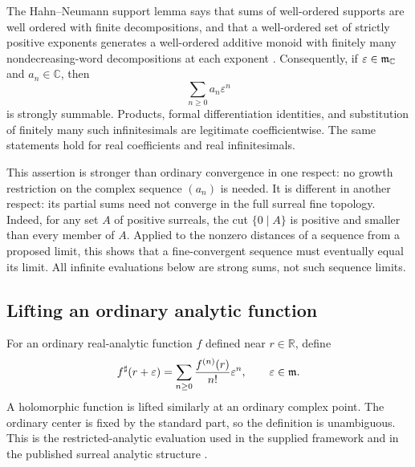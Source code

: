 \documentclass[11pt,letterpaper]{article}
\theoremstyle{definition}
\theoremstyle{remark}
\newcommand{\R}{\mathbb R}\newcommand{\C}{\mathbb C}
\newcommand{\sh}{^{\sharp}}
\numberwithin{equation}{section}
\begin{document}
The Hahn--Neumann support lemma says that sums of well-ordered supports are well ordered with finite decompositions, and that a well-ordered set of strictly positive exponents generates a well-ordered additive monoid with finitely many nondecreasing-word decompositions at each exponent \cite{Neumann,Poonen}. Consequently, if $\varepsilon\in\mm_\C$ and $a_n\in\C$, then
\[
 \sum_{n\ge0}a_n\varepsilon^n
\]
is strongly summable. Products, formal differentiation identities, and substitution of finitely many such infinitesimals are legitimate coefficientwise. The same statements hold for real coefficients and real infinitesimals.

This assertion is stronger than ordinary convergence in one respect: no growth restriction on the complex sequence $(a_n)$ is needed. It is different in another respect: its partial sums need not converge in the full surreal fine topology. Indeed, for any set $A$ of positive surreals, the cut $\{0\mid A\}$ is positive and smaller than every member of $A$. Applied to the nonzero distances of a sequence from a proposed limit, this shows that a fine-convergent sequence must eventually equal its limit. All infinite evaluations below are strong sums, not such sequence limits.

\subsection{Lifting an ordinary analytic function}
For an ordinary real-analytic function $f$ defined near $r\in\R$, define
\begin{equation}\label{eq:analyticlift}
 f\sh(r+\varepsilon)=\sum_{n\ge0}\frac{f^{(n)}(r)}{n!}\varepsilon^n,
 \qquad \varepsilon\in\mm.
\end{equation}
A holomorphic function is lifted similarly at an ordinary complex point. The ordinary center is fixed by the standard part, so the definition is unambiguous. This is the restricted-analytic evaluation used in the supplied framework and in the published surreal analytic structure \cite{SourceAnalysis,vdDE}.
\end{document}
